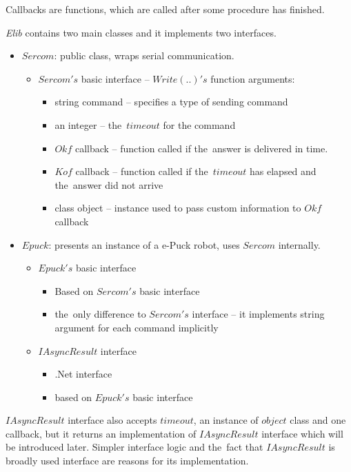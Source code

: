   \begin{remark}[Callbacks]
  Callbacks are functions, which are called after some procedure has finished.
  \end{remark}
  {\it Elib} contains two main classes and it implements two interfaces.
  \begin{itemize}
    \item $Sercom$: public class, wraps serial communication.
    \begin{itemize}
      \item $Sercom's$ basic interface -- $Write(..)'s$ function arguments:
      \begin{itemize}
        \item string command -- specifies a type of sending command
        \item an integer -- the~$timeout$ for the command
        \item $Okf$ callback -- function called if the~answer is delivered in time.
        \item $Kof$ callback -- function called if the~$timeout$ has elapsed and the~answer did not arrive
        \item class object -- instance used to pass custom information to $Okf$ callback
      \end{itemize}
    \end{itemize}
    \item $Epuck$: presents an instance of a e-Puck robot, uses $Sercom$ internally.
    \begin{itemize}
      \item $Epuck's$ basic interface 
      \begin{itemize}
        \item Based on $Sercom's$ basic interface
        \item the~only difference to $Sercom's$ interface -- it implements string argument for each command implicitly
      \end{itemize}
      \item $IAsyncResult$ interface
      \begin{itemize}
        \item .Net interface
        \item based on $Epuck's$ basic interface
      \end{itemize}
    \end{itemize}
  \end{itemize}

  $IAsyncResult$ interface also accepts $timeout$, an instance of $object$ class and one callback, but it returns 
  an implementation of $IAsyncResult$ interface which will be introduced later.
  Simpler interface logic and the~fact that $IAsyncResult$ is broadly used interface
  are reasons for its implementation.

